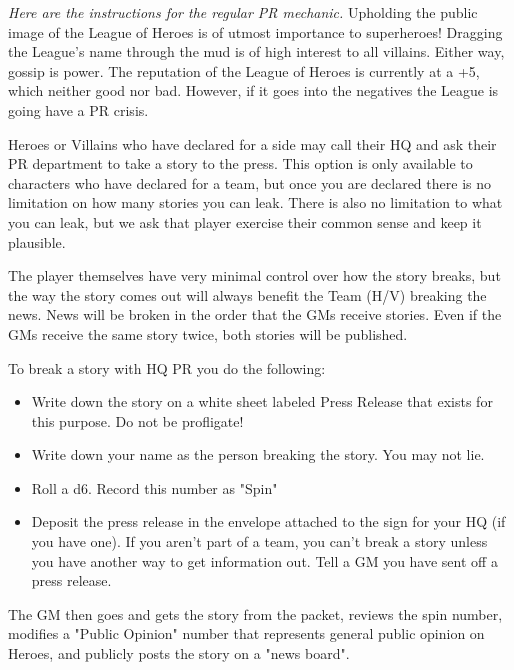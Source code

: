 \documentclass[green]{LRSguildcamp1}
\begin{document}
\textit{Here are the instructions for the regular PR mechanic. 
}
Upholding the public image of the League of Heroes is of utmost importance to superheroes! Dragging the League's name through the mud is of high interest to all villains. Either way, gossip is power. The reputation of the League of Heroes is currently at a +5, which neither good nor bad. However, if it goes into the negatives the League is going have a PR crisis. 

Heroes or Villains who have declared for a side may call their HQ and ask their PR department to take a story to the press. This option is only available to characters who have declared for a team, but once you are declared there is no limitation on how many stories you can leak. There is also no limitation to what you can leak, but we ask that player exercise their common sense and keep it plausible. 

The player themselves have very minimal control over how the story breaks, but the way the story comes out will always benefit the Team (H/V) breaking the news. News will be broken in the order that the GMs receive stories. Even if the GMs receive the same story twice, both stories will be published. 

To break a story with HQ PR you do the following:
\begin {itemize}
\item Write down the story on a white sheet labeled Press Release that exists for this purpose. Do not be profligate! 
\item Write down your name as the person breaking the story. You may not lie. 
\item Roll a d6. Record this number as "Spin"
\item Deposit the press release in the envelope attached to the sign for your HQ (if you have one). If you aren't part of a team, you can't break a story unless you have another way to get information out. Tell a GM you have sent off a press release.
\end {itemize}
The GM then goes and gets the story from the packet, reviews the spin number, modifies a "Public Opinion" number that represents general public opinion on Heroes, and publicly posts the story on a "news board". 
\end{document}
